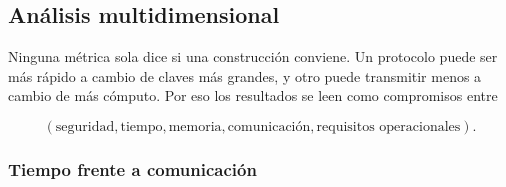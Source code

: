 \subsection{Análisis multidimensional}
\label{sec:multidimensional-analysis}

Ninguna métrica sola dice si una construcción conviene. Un protocolo puede ser más rápido a cambio de claves más grandes, 
y otro puede transmitir menos a cambio de más cómputo. Por eso los resultados se leen como compromisos entre


\begin{equation}
    (\text{seguridad},
     \text{tiempo},
     \text{memoria},
     \text{comunicación},
     \text{requisitos operacionales}).
\end{equation}

\subsubsection{Tiempo frente a comunicación}

